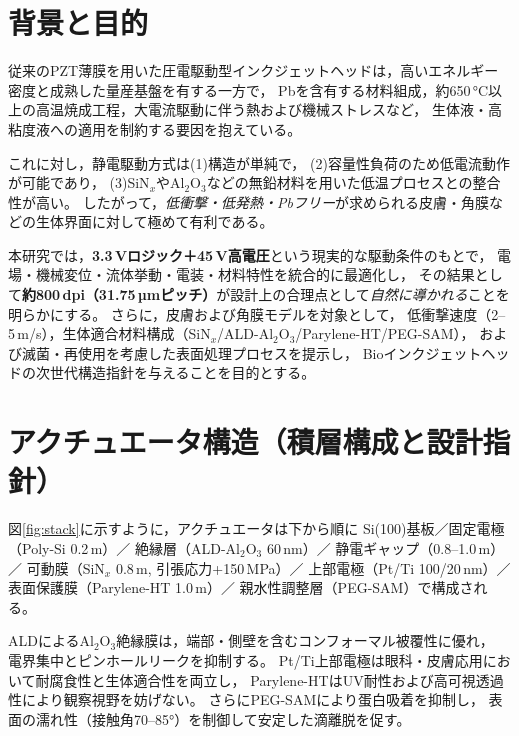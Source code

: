 \documentclass[conference]{IEEEtran}
\begin{document}
\section{背景と目的}
従来のPZT薄膜を用いた圧電駆動型インクジェットヘッドは，高いエネルギー密度と成熟した量産基盤を有する一方で，
Pbを含有する材料組成，約650\,\si{\celsius}以上の高温焼成工程，大電流駆動に伴う熱および機械ストレスなど，
生体液・高粘度液への適用を制約する要因を抱えている。

これに対し，静電駆動方式は(1)構造が単純で，
(2)容量性負荷のため低電流動作が可能であり，
(3)SiN$_x$やAl$_2$O$_3$などの無鉛材料を用いた低温プロセスとの整合性が高い。
したがって，\emph{低衝撃・低発熱・Pbフリー}が求められる皮膚・角膜などの生体界面に対して極めて有利である。

本研究では，\textbf{3.3\,Vロジック＋45\,V高電圧}という現実的な駆動条件のもとで，
電場・機械変位・流体挙動・電装・材料特性を統合的に最適化し，
その結果として\textbf{約800\,dpi（31.75\,µmピッチ）}が設計上の合理点として\emph{自然に導かれる}ことを明らかにする。
さらに，皮膚および角膜モデルを対象として，
低衝撃速度（2--5\,m/s），生体適合材料構成（SiN$_x$/ALD-Al$_2$O$_3$/Parylene-HT/PEG-SAM），
および滅菌・再使用を考慮した表面処理プロセスを提示し，
Bioインクジェットヘッドの次世代構造指針を与えることを目的とする。

\section{アクチュエータ構造（積層構成と設計指針）}
図\ref{fig:stack}に示すように，アクチュエータは下から順に
Si(100)基板／固定電極（Poly-Si 0.2\,\textmu m）／
絶縁層（ALD-Al$_2$O$_3$ 60\,nm）／
静電ギャップ（0.8--1.0\,\textmu m）／
可動膜（SiN$_x$ 0.8\,\textmu m, 引張応力+150\,MPa）／
上部電極（Pt/Ti 100/20\,nm）／
表面保護膜（Parylene-HT 1.0\,\textmu m）／
親水性調整層（PEG-SAM）で構成される。

ALDによるAl$_2$O$_3$絶縁膜は，端部・側壁を含むコンフォーマル被覆性に優れ，
電界集中とピンホールリークを抑制する。
Pt/Ti上部電極は眼科・皮膚応用において耐腐食性と生体適合性を両立し，
Parylene-HTはUV耐性および高可視透過性により観察視野を妨げない。
さらにPEG-SAMにより蛋白吸着を抑制し，
表面の濡れ性（接触角70--85°）を制御して安定した滴離脱を促す。
\end{document}
